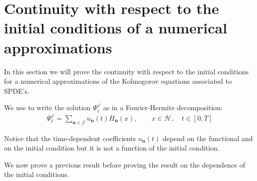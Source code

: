 \documentclass[review, onefignum, onetabnum]{siamart171218}
\begin{document}
\section{Continuity with respect to the initial conditions of a numerical 
approximations }


In this section we will prove the continuity with respect to the initial 
conditions for a numerical approximations 
of the Kolmogorov equations associated to SPDE's. 

We use  to write the solution $\Psi_t^\varphi$ as in a 
Fourier-Hermite decomposition:
\begin{align}
    \Psi_t ^ \varphi=
        \sum_{\bm{n}\in \mathcal{J}} 
        u_{\bm{n}}(t) H_{\bm{n}}(x),
        \qquad 
        x \in \mathcal{H},
        \quad t \in [0,T]\label{num-approx}
\end{align}

Notice that the time-dependent coefficients $ u_{\bm{n}}(t)$ depend on the 
functional and on the initial condition but it is not a function of 
the initial condition.


We now prove a previous result before proving the result on the dependence of 
the initial conditions.
\end{document}
